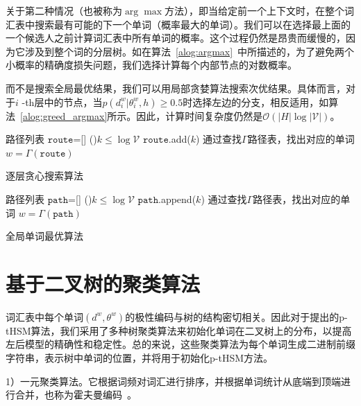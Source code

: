 关于第二种情况（也被称为$\arg\max $方法），即当给定前一个上下文时，在整个词汇表中搜索最有可能的下一个单词（概率最大的单词）。我们可以在选择最上面的一个候选人之前计算词汇表中所有单词的概率。这个过程仍然是昂贵而缓慢的，因为它涉及到整个词的分层树。如在算法~\ref{alog:argmax}~中所描述的，为了避免两个小概率的精确度损失问题，我们选择计算每个内部节点的对数概率。

而不是搜索全局最优结果，我们可以用局部贪婪算法搜索次优结果。具体而言，对于$ i $ -th层中的节点，当$ p(d ^ w_i | \theta_{i} ^ w,h)\ge 0.5 $时选择左边的分支，相反适用，如算法~\ref{alog:greed_argmax}所示。因此，计算时间复杂度仍然是$ \mathcal{O}(| H | \log \mathcal {| V |})$。


\begin{algorithm}[!ht]
\SetAlgoLined
{}
 路径列表 $\mathtt{route}$=[] \;
\While(){$k \le \log \mathcal{V}$ }{
 $\mathtt{route}$.add($k$) 
}
{通过查找$\Gamma$路径表，找出对应的单词}\;
$w=\Gamma(\mathtt{route})$\;
\caption{逐层贪心搜索算法}\label{alog:greed_argmax}
\end{algorithm}


\begin{algorithm}[!ht]
\SetAlgoLined
{}
 路径列表 $\mathtt{path}$=[] \;
\While(){$k \le \log \mathcal{V}$ }{
 $\mathtt{path}$.append($k$) 
}
{通过查找$\Gamma$路径表，找出对应的单词}\;
$w=\Gamma(\mathtt{path})$\;
\caption{全局单词最优算法}\label{alog:global}
\end{algorithm}

\section{基于二叉树的聚类算法}
词汇表中每个单词$(d^w,\theta^w)$的极性编码与树的结构密切相关。因此对于提出的p-tHSM算法，我们采用了多种树聚类算法来初始化单词在二叉树上的分布，以提高左后模型的精确性和稳定性。总的来说，这些聚类算法为每个单词生成二进制前缀字符串，表示树中单词的位置，并将用于初始化p-tHSM方法。


1）一元聚类算法。它根据词频对词汇进行排序，并根据单词统计从底端到顶端进行合并，也称为霍夫曼编码~。

